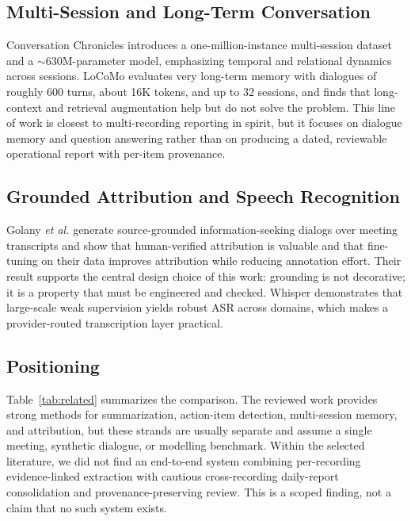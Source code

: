 \documentclass[10pt,a4paper]{article}
\newcommand{\etal}{\textit{et al.}}
\begin{document}
\subsection{Multi-Session and Long-Term Conversation}

Conversation Chronicles \cite{jang2023conversation} introduces a one-million-instance
multi-session dataset and a $\sim$630M-parameter model, emphasizing temporal and relational
dynamics across sessions. LoCoMo \cite{maharana2024locomo} evaluates very long-term memory
with dialogues of roughly 600 turns, about 16K tokens, and up to 32 sessions, and finds
that long-context and retrieval augmentation help but do not solve the problem. This line
of work is closest to multi-recording reporting in spirit, but it focuses on dialogue
memory and question answering rather than on producing a dated, reviewable operational
report with per-item provenance.

\subsection{Grounded Attribution and Speech Recognition}

Golany \etal \cite{golany2024mised} generate source-grounded information-seeking dialogs
over meeting transcripts and show that human-verified attribution is valuable and that
fine-tuning on their data improves attribution while reducing annotation effort. Their
result supports the central design choice of this work: grounding is not decorative; it is
a property that must be engineered and checked. Whisper \cite{radford2023whisper}
demonstrates that large-scale weak supervision yields robust ASR across domains, which
makes a provider-routed transcription layer practical.

\subsection{Positioning}

Table~\ref{tab:related} summarizes the comparison. The reviewed work provides strong
methods for summarization, action-item detection, multi-session memory, and attribution,
but these strands are usually separate and assume a single meeting, synthetic dialogue, or
modelling benchmark. Within the selected literature, we did not find an end-to-end system
combining per-recording evidence-linked extraction with cautious cross-recording
daily-report consolidation and provenance-preserving review. This is a scoped finding, not
a claim that no such system exists.
\end{document}
